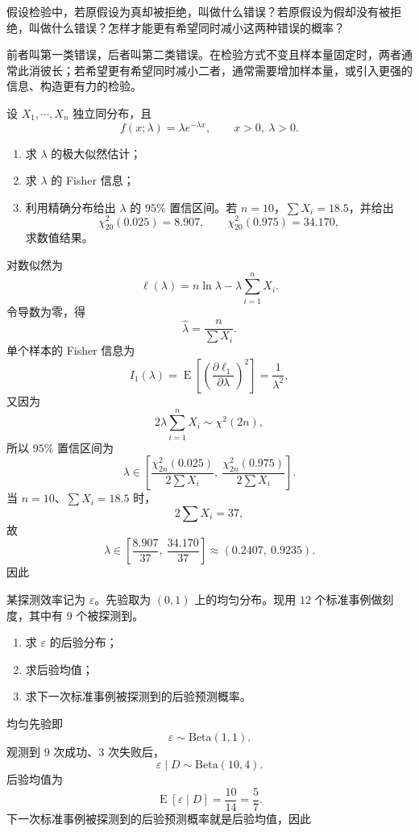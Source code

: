 ﻿

\begin{question}
假设检验中，若原假设为真却被拒绝，叫做什么错误？若原假设为假却没有被拒绝，叫做什么错误？怎样才能更有希望同时减小这两种错误的概率？
\begin{solution}
前者叫第一类错误，后者叫第二类错误。在检验方式不变且样本量固定时，两者通常此消彼长；若希望更有希望同时减小二者，通常需要增加样本量，或引入更强的信息、构造更有力的检验。
\end{solution}
\end{question}

\begin{question}
设 $X_1,\cdots,X_n$ 独立同分布，且
\[
f(x;\lambda)=\lambda e^{-\lambda x},\qquad x>0,\ \lambda>0.
\]
\begin{enumerate}
\item 求 $\lambda$ 的极大似然估计；
\item 求 $\lambda$ 的 Fisher 信息；
\item 利用精确分布给出 $\lambda$ 的 $95\%$ 置信区间。若 $n=10$，$\sum X_i=18.5$，并给出
\[
\chi^2_{20}(0.025)=8.907,\qquad \chi^2_{20}(0.975)=34.170,
\]
求数值结果。
\end{enumerate}
\begin{solution}
对数似然为
\[
\ell(\lambda)=n\ln\lambda-\lambda\sum_{i=1}^n X_i.
\]
令导数为零，得
\[
\hat\lambda=\frac{n}{\sum X_i}.
\]
单个样本的 Fisher 信息为
\[
I_1(\lambda)=\operatorname{E}\left[\left(\frac{\partial \ell_1}{\partial\lambda}\right)^2\right]=\frac{1}{\lambda^2},
\]
又因为
\[
2\lambda\sum_{i=1}^n X_i\sim \chi^2(2n),
\]
所以 $95\%$ 置信区间为
\[
\lambda\in \left[\frac{\chi^2_{2n}(0.025)}{2\sum X_i},\ \frac{\chi^2_{2n}(0.975)}{2\sum X_i}\right].
\]
当 $n=10$、$\sum X_i=18.5$ 时，
\[
2\sum X_i=37,
\]
故
\[
\lambda\in \left[\frac{8.907}{37},\ \frac{34.170}{37}\right]
\approx (0.2407,\ 0.9235).
\]
因此
\end{solution}
\end{question}

\begin{question}
某探测效率记为 $\varepsilon$。先验取为 $(0,1)$ 上的均匀分布。现用 $12$ 个标准事例做刻度，其中有 $9$ 个被探测到。
\begin{enumerate}
\item 求 $\varepsilon$ 的后验分布；
\item 求后验均值；
\item 求下一次标准事例被探测到的后验预测概率。
\end{enumerate}
\begin{solution}
均匀先验即
\[
\varepsilon\sim \mathrm{Beta}(1,1).
\]
观测到 $9$ 次成功、$3$ 次失败后，
\[
\varepsilon\mid D\sim \mathrm{Beta}(10,4).
\]
后验均值为
\[
\operatorname{E}[\varepsilon\mid D]=\frac{10}{14}=\frac57.
\]
下一次标准事例被探测到的后验预测概率就是后验均值，因此
\end{solution}
\end{question}

